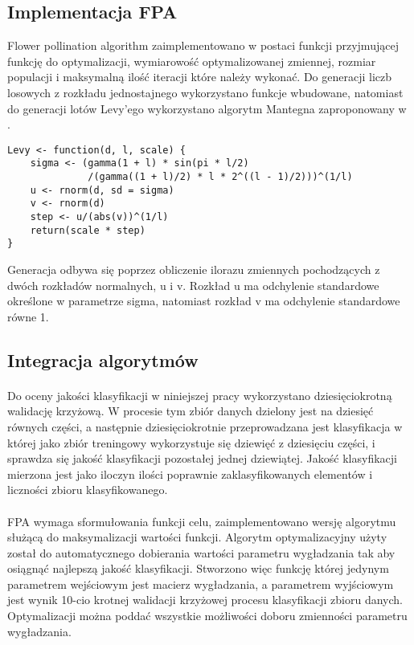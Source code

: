 \documentclass[a4paper,12pt,twoside]{article}
\begin{document}
\subsection{Implementacja FPA}
Flower pollination  algorithm zaimplementowano w postaci funkcji przyjmującej funkcję do optymalizacji, wymiarowość optymalizowanej zmiennej, rozmiar populacji i maksymalną ilość iteracji które należy wykonać. Do generacji liczb losowych z rozkładu jednostajnego wykorzystano funkcje wbudowane, natomiast do generacji lotów Levy'ego wykorzystano algorytm Mantegna zaproponowany w \cite{FPA}. 
\begin{lstlisting}[caption={Algorytm Mantegana do generacli lotów Levy'ego}]
Levy <- function(d, l, scale) {
    sigma <- (gamma(1 + l) * sin(pi * l/2)
              /(gamma((1 + l)/2) * l * 2^((l - 1)/2)))^(1/l)
    u <- rnorm(d, sd = sigma)
    v <- rnorm(d)
    step <- u/(abs(v))^(1/l)
    return(scale * step)
}
\end{lstlisting}
Generacja odbywa się poprzez obliczenie ilorazu zmiennych pochodzących z dwóch rozkładów normalnych, u i v. Rozkład u ma odchylenie standardowe określone w parametrze sigma, natomiast rozkład v ma odchylenie standardowe równe 1. 
\newpage
\subsection{Integracja algorytmów}
\paragraph{}
Do oceny jakości klasyfikacji w niniejszej pracy wykorzystano dziesięciokrotną walidację krzyżową. W procesie tym zbiór danych dzielony jest na dziesięć równych części, a następnie dziesięciokrotnie przeprowadzana jest klasyfikacja w której jako zbiór treningowy wykorzystuje się dziewięć z dziesięciu części, i sprawdza się jakość klasyfikacji pozostałej jednej dziewiątej. Jakość klasyfikacji mierzona jest jako iloczyn ilości poprawnie zaklasyfikowanych elementów i liczności zbioru klasyfikowanego.  
\paragraph{}
FPA wymaga sformułowania funkcji celu, zaimplementowano wersję algorytmu służącą do maksymalizacji wartości funkcji. Algorytm optymalizacyjny użyty został do automatycznego dobierania wartości parametru wygładzania tak aby osiągnąć najlepszą jakość klasyfikacji. Stworzono więc funkcję której jedynym parametrem wejściowym jest macierz wygładzania, a parametrem wyjściowym jest wynik 10-cio krotnej walidacji krzyżowej procesu klasyfikacji zbioru danych. Optymalizacji można poddać wszystkie możliwości doboru zmienności parametru wygładzania.
\end{document}
